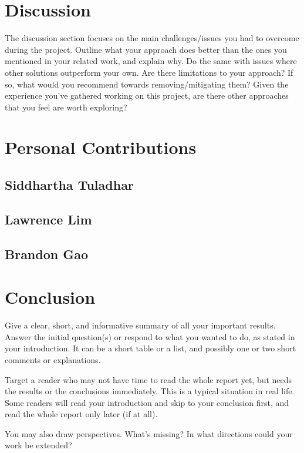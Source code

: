 \documentclass{scrartcl}
\begin{document}
\section{Discussion}
The discussion section focuses on the main challenges/issues you had to overcome during the project. Outline what your approach does better than the ones you mentioned in your related work, and explain why. Do the same with issues where other solutions  outperform your own. Are there limitations to your approach? If so, what would you recommend towards removing/mitigating them? Given the experience you've gathered working on this project, are there other approaches that you feel are worth exploring?

\section{Personal Contributions}

\subsection{Siddhartha Tuladhar}

\subsection{Lawrence Lim}

\subsection{Brandon Gao}

\section{Conclusion}

Give a clear, short, and informative summary of all your important results. Answer the initial question(s) or respond to what you wanted to do, as stated in your introduction. It can be a short table or a list, and possibly one or two short comments or explanations. 

Target a reader who may not have time to read the whole report yet, but needs the results or the conclusions immediately. This is a typical situation in real life. Some readers will read your introduction and skip to your conclusion first, and read the whole report only later (if at all).

You may also draw perspectives. What's missing? In what directions could your work be extended?

\newpage
\singlespacing




\end{document}
